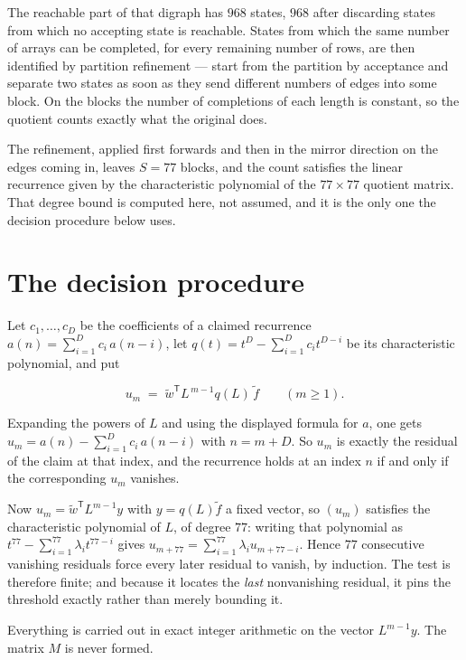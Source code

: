 \documentclass[11pt]{article}
\theoremstyle{definition}
\begin{document}
The reachable part of that digraph has $968$ states, $968$ after discarding states from which no accepting state is reachable. States from which the same number of arrays can be completed, for every remaining number of rows, are then identified by partition refinement --- start from the partition by acceptance and separate two states as soon as they send different numbers of edges into some block. On the blocks the number of completions of each length is constant, so the quotient counts exactly what the original does.

The refinement, applied first forwards and then in the mirror direction on the edges coming in, leaves $S = 77$ blocks, and the count satisfies the linear recurrence given by the characteristic polynomial of the $77 \times 77$ quotient matrix. That degree bound is computed here, not assumed, and it is the only one the decision procedure below uses.

\section{The decision procedure}

Let $c_1,\dots,c_D$ be the coefficients of a claimed recurrence $a(n) = \sum_{i=1}^{D} c_i\,a(n-i)$, let $q(t) = t^{D} - \sum_{i=1}^{D} c_i t^{D-i}$ be its characteristic polynomial, and put

\[u_m \;=\; \tilde w^{\mathsf T} L^{\,m-1} q(L)\,\tilde f \qquad (m \ge 1).\]

Expanding the powers of $L$ and using the displayed formula for $a$, one gets $u_m = a(n) - \sum_{i=1}^{D} c_i\,a(n-i)$ with $n = m + D$. So $u_m$ is exactly the residual of the claim at that index, and the recurrence holds at an index $n$ if and only if the corresponding $u_m$ vanishes.

Now $u_m = \tilde w^{\mathsf T} L^{m-1} y$ with $y = q(L)\tilde f$ a fixed vector, so $(u_m)$ satisfies the characteristic polynomial of $L$, of degree $77$: writing that polynomial as $t^{77} - \sum_{i=1}^{77} \lambda_i t^{77-i}$ gives $u_{m+77} = \sum_{i=1}^{77} \lambda_i u_{m+77-i}$. Hence $77$ consecutive vanishing residuals force every later residual to vanish, by induction. The test is therefore finite; and because it locates the {\itshape last} nonvanishing residual, it pins the threshold exactly rather than merely bounding it.

Everything is carried out in exact integer arithmetic on the vector $L^{m-1}y$. The matrix $M$ is never formed.
\end{document}
